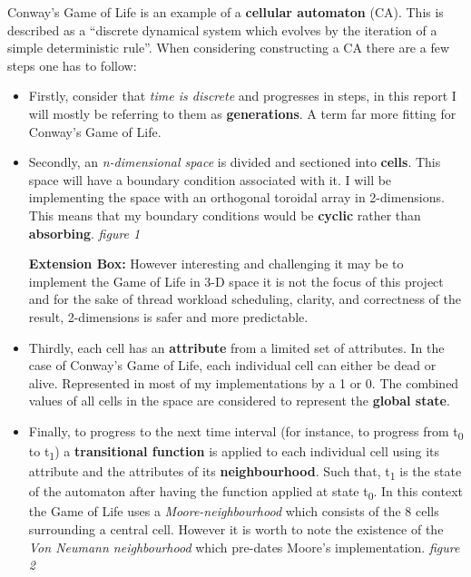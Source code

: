 \documentclass[11pt]{article} %
\begin{document}
Conway's Game of Life is an example of a {\bf cellular automaton} (CA). This is described \cite[Lesser, Wuensche, 1992 p6]{ref6} as a ``discrete dynamical system which evolves by the iteration of a simple deterministic rule''. When considering constructing a CA there are a few steps one has to follow:
\begin{itemize}
\item Firstly, consider that \emph{time is discrete} and progresses in steps, in this report I will mostly be referring to them as {\bf generations}. A term far more fitting for Conway's Game of Life. 
\item Secondly, an \emph{n-dimensional space} is divided and sectioned into {\bf cells}. This space will have a boundary condition associated with it. I will be implementing the space with an orthogonal toroidal array in 2-dimensions. This means that my boundary conditions would be {\bf cyclic} rather than {\bf absorbing}. {\it figure 1}
\begin{mdframed}
{\bf Extension Box:} However interesting and challenging it may be to implement the Game of Life in 3-D space it is not the focus of this project and for the sake of thread workload scheduling, clarity, and correctness of the result, 2-dimensions is safer and more predictable.
\end{mdframed}
\item Thirdly, each cell has an {\bf attribute} from a limited set of attributes. In the case of Conway's Game of Life, each individual cell can either be dead or alive. Represented in most of my implementations by a 1 or 0. The combined values of all cells in the space are considered to represent the {\bf global state}.
\item Finally, to progress to the next time interval (for instance, to progress from t\textsubscript{0} to t\textsubscript{1}) a {\bf transitional function} is applied to each individual cell using its attribute and the attributes of its {\bf neighbourhood}. Such that, t\textsubscript{1} is the state of the automaton after having the function applied at state t\textsubscript{0}. In this context the Game of Life uses a \emph{Moore-neighbourhood} which consists of the 8 cells surrounding a central cell. However it is worth to note the existence of the \emph{Von Neumann neighbourhood} which pre-dates Moore's implementation. {\it figure 2}
\end{itemize}
\end{document}
